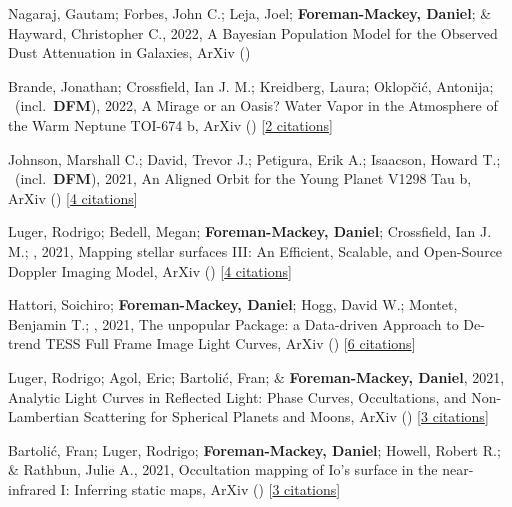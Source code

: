 \item[{\color{numcolor}\scriptsize11}] Nagaraj, Gautam; Forbes, John C.; Leja, Joel; \textbf{Foreman-Mackey, Daniel}; \& Hayward, Christopher C., 2022, A Bayesian Population Model for the Observed Dust Attenuation in Galaxies, ArXiv ()

\item[{\color{numcolor}\scriptsize10}] Brande, Jonathan; Crossfield, Ian J. M.; Kreidberg, Laura; Oklop{\v{c}}i{\'c}, Antonija; \etal\ (incl.\ \textbf{DFM}), 2022, A Mirage or an Oasis? Water Vapor in the Atmosphere of the Warm Neptune TOI-674 b, ArXiv () [\href{https://ui.adsabs.harvard.edu/abs/2022arXiv220104197B}{2 citations}]

\item[{\color{numcolor}\scriptsize9}] Johnson, Marshall C.; David, Trevor J.; Petigura, Erik A.; Isaacson, Howard T.; \etal\ (incl.\ \textbf{DFM}), 2021, An Aligned Orbit for the Young Planet V1298 Tau b, ArXiv () [\href{https://ui.adsabs.harvard.edu/abs/2021arXiv211010707J}{4 citations}]

\item[{\color{numcolor}\scriptsize8}] Luger, Rodrigo; Bedell, Megan; \textbf{Foreman-Mackey, Daniel}; Crossfield, Ian J. M.; \etal, 2021, Mapping stellar surfaces III: An Efficient, Scalable, and Open-Source Doppler Imaging Model, ArXiv () [\href{https://ui.adsabs.harvard.edu/abs/2021arXiv211006271L}{4 citations}]

\item[{\color{numcolor}\scriptsize7}] Hattori, Soichiro; \textbf{Foreman-Mackey, Daniel}; Hogg, David W.; Montet, Benjamin T.; \etal, 2021, The unpopular Package: a Data-driven Approach to De-trend TESS Full Frame Image Light Curves, ArXiv () [\href{https://ui.adsabs.harvard.edu/abs/2021arXiv210615063H}{6 citations}]

\item[{\color{numcolor}\scriptsize6}] Luger, Rodrigo; Agol, Eric; Bartoli{\'c}, Fran; \& \textbf{Foreman-Mackey, Daniel}, 2021, Analytic Light Curves in Reflected Light: Phase Curves, Occultations, and Non-Lambertian Scattering for Spherical Planets and Moons, ArXiv () [\href{https://ui.adsabs.harvard.edu/abs/2021arXiv210306275L}{3 citations}]

\item[{\color{numcolor}\scriptsize5}] Bartoli{\'c}, Fran; Luger, Rodrigo; \textbf{Foreman-Mackey, Daniel}; Howell, Robert R.; \& Rathbun, Julie A., 2021, Occultation mapping of Io's surface in the near-infrared I: Inferring static maps, ArXiv () [\href{https://ui.adsabs.harvard.edu/abs/2021arXiv210303758B}{3 citations}]


